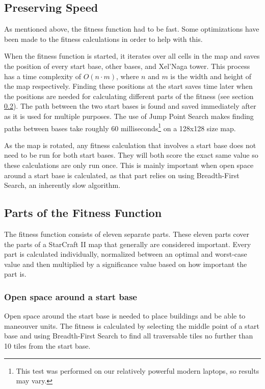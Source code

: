 \subsection{Preserving Speed}
\label{methodology_mapfitness_speed}

As mentioned above, the fitness function had to be fast. Some optimizations have been made to the fitness calculations in order to help with this.

When the fitness function is started, it iterates over all cells in the map and saves the position of every start base, other bases, and Xel'Naga tower. This process has a time complexity of $O(n\cdot m)$, where $n$ and $m$ is the width and height of the map respectively. Finding these positions at the start saves time later when the positions are needed for calculating different parts of the fitness (see section \ref{methodology_mapfitness_parts}). The path between the two start bases is found and saved immediately after as it is used for multiple purposes. The use of Jump Point Search makes finding paths between bases take roughly 60 milliseconds\footnote{This test was performed on our relatively powerful modern laptops, so results may vary.} on a 128x128 size map.

As the map is rotated, any fitness calculation that involves a start base does not need to be run for both start bases. They will both score the exact same value so these calculations are only run once. This is mainly important when open space around a start base is calculated, as that part relies on using Breadth-First Search, an inherently slow algorithm.

\subsection{Parts of the Fitness Function}
\label{methodology_mapfitness_parts}

The fitness function consists of eleven separate parts. These eleven parts cover the parts of a StarCraft II map that generally are considered important. Every part is calculated individually, normalized between an optimal and worst-case value and then multiplied by a significance value based on how important the part is.

	\subsubsection*{Open space around a start base} 
	Open space around the start base is needed to place buildings and be able to maneouver units. The fitness is calculated by selecting the middle point of a start base and using Breadth-First Search to find all traversable tiles no further than 10 tiles from the start base.

